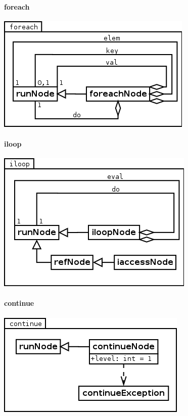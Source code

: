 \paragraph{foreach}
\begin{center}
\includegraphics[scale=0.4]{foreach.png} \\
\end{center}

\paragraph{iloop}
\begin{center}
\includegraphics[scale=0.4]{iloop.png} \\
\end{center}


\paragraph{continue}
\begin{center}
\includegraphics[scale=0.4]{continue.png} \\
\end{center}


